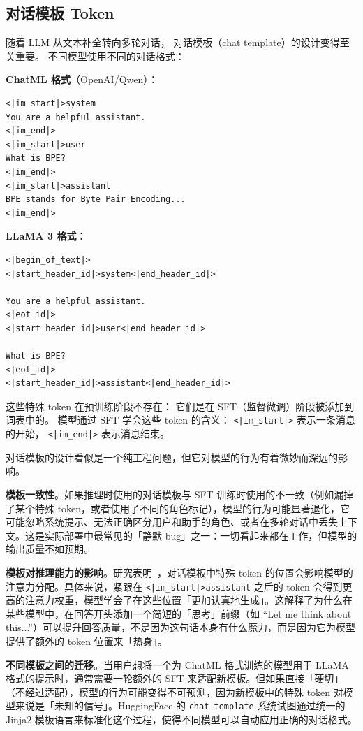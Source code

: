 \subsection{对话模板 Token}

随着 LLM 从文本补全转向多轮对话，
对话模板（chat template）的设计变得至关重要。
不同模型使用不同的对话格式：

\textbf{ChatML 格式}（OpenAI/Qwen）：
\begin{lstlisting}[language={}]
<|im_start|>system
You are a helpful assistant.
<|im_end|>
<|im_start|>user
What is BPE?
<|im_end|>
<|im_start|>assistant
BPE stands for Byte Pair Encoding...
<|im_end|>
\end{lstlisting}

\textbf{LLaMA 3 格式}：
\begin{lstlisting}[language={}]
<|begin_of_text|>
<|start_header_id|>system<|end_header_id|>

You are a helpful assistant.
<|eot_id|>
<|start_header_id|>user<|end_header_id|>

What is BPE?
<|eot_id|>
<|start_header_id|>assistant<|end_header_id|>
\end{lstlisting}

这些特殊 token 在预训练阶段不存在：
它们是在 SFT（监督微调）阶段被添加到词表中的。
模型通过 SFT 学会这些 token 的含义：
\texttt{<|im\_start|>} 表示一条消息的开始，
\texttt{<|im\_end|>} 表示消息结束。

对话模板的设计看似是一个纯工程问题，但它对模型的行为有着微妙而深远的影响。

\textbf{模板一致性}。如果推理时使用的对话模板与 SFT 训练时使用的不一致（例如漏掉了某个特殊 token，或者使用了不同的角色标记），模型的行为可能显著退化，它可能忽略系统提示、无法正确区分用户和助手的角色、或者在多轮对话中丢失上下文。这是实际部署中最常见的「静默 bug」之一：一切看起来都在工作，但模型的输出质量不如预期。

\textbf{模板对推理能力的影响}。研究表明~\cite{zheng2024judging}，对话模板中特殊 token 的位置会影响模型的注意力分配。具体来说，紧跟在 \texttt{<|im\_start|>assistant} 之后的 token 会得到更高的注意力权重，模型学会了在这些位置「更加认真地生成」。这解释了为什么在某些模型中，在回答开头添加一个简短的「思考」前缀（如 “Let me think about this...”）可以提升回答质量，不是因为这句话本身有什么魔力，而是因为它为模型提供了额外的 token 位置来「热身」。

\textbf{不同模板之间的迁移}。当用户想将一个为 ChatML 格式训练的模型用于 LLaMA 格式的提示时，通常需要一轮额外的 SFT 来适配新模板。但如果直接「硬切」（不经过适配），模型的行为可能变得不可预测，因为新模板中的特殊 token 对模型来说是「未知的信号」。HuggingFace 的 \texttt{chat\_template} 系统试图通过统一的 Jinja2 模板语言来标准化这个过程，使得不同模型可以自动应用正确的对话格式。

